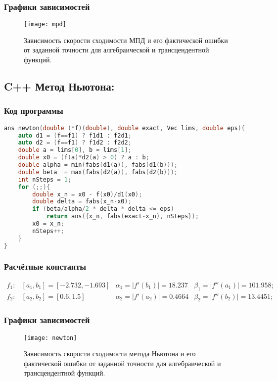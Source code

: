 \subsubsection{Графики зависимостей}
\begin{figure}[H]
    \centering
    \caption{Зависимость скорости сходимости МПД и его фактической ошибки от заданной точности для алгебраической и трансцендентной функций.}
    \label{fig:pic4}
    \texttt{[image: mpd]}
\end{figure}

\clearpage

\subsection{C++ Метод Ньютона:}
\subsubsection{Код программы}
\begin{lstlisting}[language=c++, firstnumber=22]
ans newton(double (*f)(double), double exact, Vec lims, double eps){
    auto d1 = (f==f1) ? f1d1 : f2d1;
    auto d2 = (f==f1) ? f1d2 : f2d2;
    double a = lims[0], b = lims[1];
    double x0 = (f(a)*d2(a) > 0) ? a : b;
    double alpha = min(fabs(d1(a)), fabs(d1(b)));
    double beta  = max(fabs(d2(a)), fabs(d2(b)));
    int nSteps = 1;
    for (;;){
        double x_n = x0 - f(x0)/d1(x0);
        double delta = fabs(x_n-x0);
        if (beta/alpha/2 * delta * delta <= eps)
            return ans({x_n, fabs(exact-x_n), nSteps});
        x0 = x_n;
        nSteps++;
    }
}
\end{lstlisting}
\subsubsection{Расчётные константы}
\begin{equation}
\begin{matrix}
    f_1: & [a_1,b_1] =\mathit{[-2.732, -1.693]} &\alpha_1=|f'(b_1)|=\mathbf{18.237} &\beta_1=|f''(a_1)|=\mathbf{101.958}; \\
    f_2: & [a_2,b_2] =\mathit{[0.6, 1.5]} &\alpha_2=|f'(a_2)|=\mathbf{0.4664} &\beta_2=|f''(b_2)|=\mathbf{13.4451};
\end{matrix}
\end{equation}
\subsubsection{Графики зависимостей}
\begin{figure}[H]
    \centering
    \caption{Зависимость скорости сходимости метода Ньютона и его фактической ошибки от заданной точности для алгебраической и трансцендентной функций.}
    \label{fig:pic5}
    \texttt{[image: newton]}
\end{figure}


